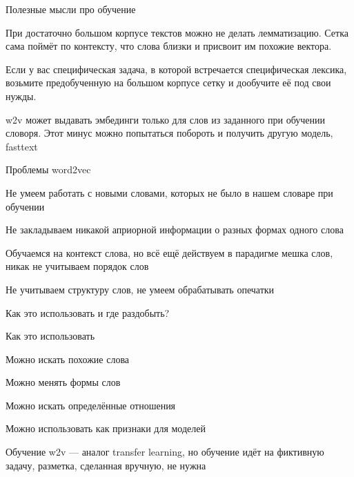 \documentclass[notes,12pt, aspectratio=169]{beamer}
\newenvironment{transitionframe}{
  \setbeamercolor{background canvas}{bg=yellow}
  \begin{frame}}{
    \end{frame}
}
\newenvironment{wideitemize}{\itemize\addtolength{\itemsep}{10pt}}{\enditemize}
\begin{document}
\begin{frame}{Полезные мысли про обучение}
\begin{wideitemize} 
\item  При достаточно большом корпусе текстов можно не делать лемматизацию. Сетка сама поймёт по контексту, что слова близки и присвоит им похожие вектора.

\item Если у вас специфическая задача, в которой встречается специфическая лексика, возьмите предобученную на большом корпусе сетку и дообучите её под свои нужды.

\item \alert{w2v может выдавать эмбединги только для слов из заданного при обучении словоря.} Этот минус можно попытаться побороть и получить другую модель, fasttext
\end{wideitemize} 
\end{frame} 


\begin{frame}{Проблемы word2vec}
\begin{wideitemize} 
	\item Не умеем работать с новыми словами, которых не было в нашем словаре при обучении
	
	\item  Не закладываем никакой априорной информации о разных
	формах одного слова
	
	\item  Обучаемся на контекст слова, но всё ещё действуем в парадигме мешка слов, никак не учитываем порядок слов
	
	\item Не учитываем структуру слов, не умеем обрабатывать опечатки	
\end{wideitemize} 
\end{frame} 



\begin{transitionframe}
	\begin{center}
		\Huge  Как это использовать и где раздобыть?
	\end{center}
\end{transitionframe}


\begin{frame}{Как это использовать}
\begin{wideitemize} 
	\item Можно искать похожие слова
	
	\item  Можно менять формы слов
	
	\item  Можно искать определённые отношения
	
	\item  Можно использовать как признаки для моделей
	
	\item  Обучение w2v — аналог transfer learning, но обучение идёт на фиктивную задачу, разметка, сделанная вручную, не нужна
\end{wideitemize} 
\end{frame} 
\end{document}

